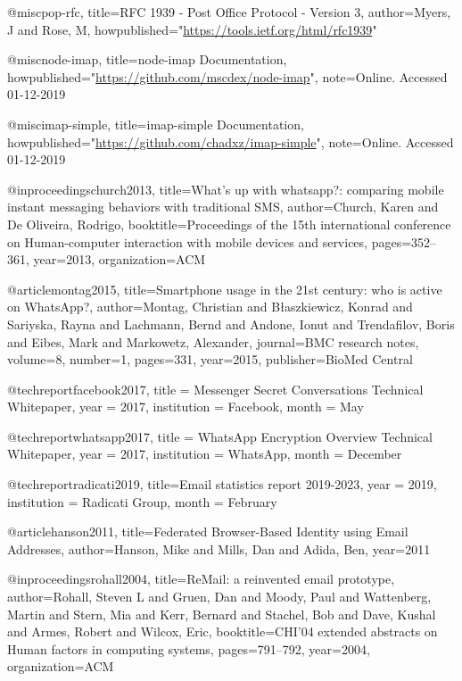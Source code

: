@misc{pop-rfc,
  title={{RFC 1939 - Post Office Protocol - Version 3}},
  author={Myers, J and Rose, M},
  howpublished="\url{https://tools.ietf.org/html/rfc1939}"
}

@misc{node-imap,
  title={{node-imap Documentation}},
  howpublished="\url{https://github.com/mscdex/node-imap}",
  note={Online. Accessed 01-12-2019}
}

@misc{imap-simple,
  title={{imap-simple Documentation}},
  howpublished="\url{https://github.com/chadxz/imap-simple}",
  note={Online. Accessed 01-12-2019}
}

@inproceedings{church2013,
  title={{What's up with whatsapp?: comparing mobile instant messaging behaviors with traditional SMS}},
  author={Church, Karen and De Oliveira, Rodrigo},
  booktitle={Proceedings of the 15th international conference on Human-computer interaction with mobile devices and services},
  pages={352--361},
  year={2013},
  organization={ACM}
}

@article{montag2015,
  title={{Smartphone usage in the 21st century: who is active on WhatsApp?}},
  author={Montag, Christian and B{\l}aszkiewicz, Konrad and Sariyska, Rayna and Lachmann, Bernd and Andone, Ionut and Trendafilov, Boris and Eibes, Mark and Markowetz, Alexander},
  journal={BMC research notes},
  volume={8},
  number={1},
  pages={331},
  year={2015},
  publisher={BioMed Central}
}

@techreport{facebook2017,
  title = {{Messenger Secret Conversations Technical Whitepaper}},
  year = {2017},
  institution = {Facebook},
  month = {May}
}

@techreport{whatsapp2017,
  title = {{WhatsApp Encryption Overview Technical Whitepaper}},
  year = {2017},
  institution = {WhatsApp},
  month = {December}
}

@techreport{radicati2019,
  title={{Email statistics report 2019-2023}},
  year = {2019},
  institution = {Radicati Group},
  month = {February}
}

@article{hanson2011,
  title={{Federated Browser-Based Identity using Email Addresses}},
  author={Hanson, Mike and Mills, Dan and Adida, Ben},
  year={2011}
}

@inproceedings{rohall2004,
  title={{ReMail: a reinvented email prototype}},
  author={Rohall, Steven L and Gruen, Dan and Moody, Paul and Wattenberg, Martin and Stern, Mia and Kerr, Bernard and Stachel, Bob and Dave, Kushal and Armes, Robert and Wilcox, Eric},
  booktitle={CHI'04 extended abstracts on Human factors in computing systems},
  pages={791--792},
  year={2004},
  organization={ACM}
}

